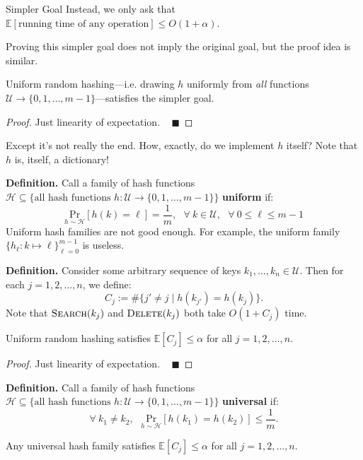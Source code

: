 \begin{problem}{Simpler Goal}
Instead, we only ask that $\mathbb{E}[\text{running time of any operation}] \leq O(1 + \alpha)$.
\end{problem}

Proving this simpler goal does not imply the original goal, but the proof idea is similar.

\begin{claim}
Uniform random hashing---i.e. drawing $h$ uniformly from \emph{all} functions $\mathcal{U} \to \{0, 1, \dots, m - 1\}$---satisfies the simpler goal.
\end{claim}

\begin{proof}
    Just linearity of expectation. ~ $\blacksquare$
\end{proof}

Except it's not really the end.  How, exactly, do we implement $h$ itself?  Note that $h$ is, itself, a dictionary!

\textbf{Definition.} Call a family of hash functions $\mathcal{H} \subseteq \{\text{all hash functions } h: \mathcal{U} \to \{0, 1, \dots, m - 1\}\}$ \textbf{uniform} if:
\[ \underset{h \sim \mathcal{H}}{\mathrm{Pr}} [ h(k) = \ell] = \dfrac{1}{m}, ~~~ \forall \ k \in \mathcal{U}, ~~~ \forall \ 0 \leq \ell \leq m - 1 \]
Uniform hash families are not good enough.  For example, the uniform family $\{h_\ell: k \mapsto \ell \}_{\ell = 0}^{m - 1}$ is useless.

\textbf{Definition.} Consider some arbitrary sequence of keys $k_1, \dots, k_n \in \mathcal{U}$.  Then for each $j = 1, 2, \dots, n$, we define:
\[ C_j := \# \{ j' \neq j \mid h(k_{j'}) = h(k_j)\}. \]
Note that $\textsc{Search}(k_j)$ and $\textsc{Delete}(k_j)$ both take $O(1 + C_j)$ time.

\begin{claim}
Uniform random hashing satisfies $\mathbb{E}[C_j] \leq \alpha$ for all $j = 1, 2, \dots, n$.
\end{claim}

\begin{proof}
    Just linearity of expectation. ~ $\blacksquare$
\end{proof}

\textbf{Definition.} Call a family of hash functions $\mathcal{H} \subseteq \{\text{all hash functions } h: \mathcal{U} \to \{0, 1, \dots, m - 1\}\}$ \textbf{universal} if:
\[ \forall \ k_1 \neq k_2, ~~~ \underset{h \sim \mathcal{H}}{\mathrm{Pr}}[h(k_1) = h(k_2)] \leq \dfrac{1}{m}. \]
\begin{claim}
Any universal hash family satisfies $\mathbb{E}[C_j] \leq \alpha$ for all $j = 1, 2, \dots, n$.
\end{claim}

